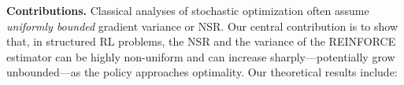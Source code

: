 

\textbf{Contributions.}
Classical analyses of stochastic optimization often assume \emph{uniformly bounded} gradient variance or NSR.
Our central contribution is to show that, in structured RL problems, the NSR and the variance of the REINFORCE estimator can be highly non-uniform and can increase sharply---potentially grow unbounded---as the policy approaches optimality. Our theoretical results include:

\vspace{-3mm}

